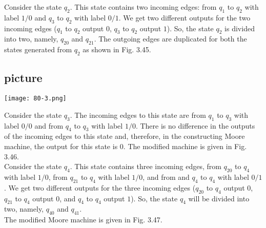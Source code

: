 \documentclass[9pt]{beamer}
\begin{document}
\begin{frame}
\hspace*{0.3cm} Consider the state $q_2$. This state contains two
incoming edges: from $q_1$ to $q_2$ with label $1/0$ and $q_3$
to $q_2$ with label $0/1$. We get two different outputs
for the two incoming edges ($q_1$ to $q_2$ output $0$, $q_3$
to $q_2$ output $1$). So, the state $q_2$ is divided into two,
namely, $q_20$ and $q_21$. The outgoing edges are duplicated
for both the states generated from $q_2$ as shown
in Fig. 3.45.\\

\pause
\begin{center}
\section{picture}
\texttt{[image: 80-3.png]}
\end{center}
\end{frame}

\begin{frame}
Consider the state $q_3$. The incoming edges to this state are from $q_1$ to $q_3$ with label $0/0$ and from $q_4$ to $q_3$
with label $1/0$. There is no difference in the outputs of the incoming edges to this state and, therefore,
in the constructing Moore machine, the output for this state is $0$. The modified machine is given in
Fig. 3.46.\\
\hspace*{0.3cm} Consider the state $q_4$. This state contains three incoming edges, from $q_20$ to $q_4$ with label $1/0$, from $q_21$ to
$q_4$ with label $1/0$, and from and $q_4$ to $q_4$ with label $0/1$. We get two different outputs for the three incoming
edges ($q_20$ to $q_4$ output $0$, $q_21$ to $q_4$ output $0$, and $q_4$ to $q_4$ output $1$). So, the state $q_4$ will be divided into two,
namely, $q_40$ and $q_41$.\\
\hspace*{0.3cm} The modified Moore machine is given in Fig. 3.47.
\end{frame}
\end{document}
